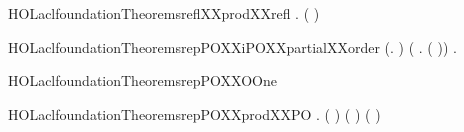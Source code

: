 \newcommand{\HOLaclfoundationTheoremsPOXXrepPO}{\UseVerbatim{HOLaclfoundationTheoremsPOXXrepPO}}
\begin{SaveVerbatim}{HOLaclfoundationTheoremsreflXXprodXXrefl}
\HOLTokenTurnstile{} \HOLSymConst{\HOLTokenForall{}} .   \HOLSymConst{\HOLTokenConj{}}   \HOLSymConst{\HOLTokenImp{}}  (  )
\end{SaveVerbatim}
\newcommand{\HOLaclfoundationTheoremsreflXXprodXXrefl}{\UseVerbatim{HOLaclfoundationTheoremsreflXXprodXXrefl}}
\begin{SaveVerbatim}{HOLaclfoundationTheoremsrepPOXXiPOXXpartialXXorder}
\HOLTokenTurnstile{} (\HOLSymConst{\HOLTokenForall{}}.    ) \HOLSymConst{\HOLTokenConj{}}
   (\HOLSymConst{\HOLTokenForall{}} .     \HOLSymConst{\HOLTokenConj{}}     \HOLSymConst{\HOLTokenImp{}} ( \HOLSymConst{=} )) \HOLSymConst{\HOLTokenConj{}}
   \HOLSymConst{\HOLTokenForall{}}  .     \HOLSymConst{\HOLTokenConj{}}     \HOLSymConst{\HOLTokenImp{}}    
\end{SaveVerbatim}
\newcommand{\HOLaclfoundationTheoremsrepPOXXiPOXXpartialXXorder}{\UseVerbatim{HOLaclfoundationTheoremsrepPOXXiPOXXpartialXXorder}}
\begin{SaveVerbatim}{HOLaclfoundationTheoremsrepPOXXOOne}
\HOLTokenTurnstile{}   \HOLSymConst{=} 
\end{SaveVerbatim}
\newcommand{\HOLaclfoundationTheoremsrepPOXXOOne}{\UseVerbatim{HOLaclfoundationTheoremsrepPOXXOOne}}
\begin{SaveVerbatim}{HOLaclfoundationTheoremsrepPOXXprodXXPO}
\HOLTokenTurnstile{} \HOLSymConst{\HOLTokenForall{}} .
      (  ) \HOLSymConst{=}  ( ) ( )
\end{SaveVerbatim}

